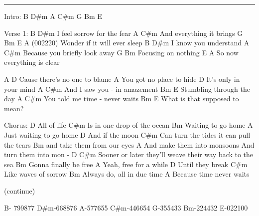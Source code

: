 \noindent\rule{\columnwidth}{1pt}

\begin{multicols}{2}
\begin{lstsong}
Intro:
B D#m A C#m G  Bm E

Verse 1:
        B            D#m
I feel sorrow for the fear
      A              C#m 
And everything it brings
   G         Bm          E     A (002220)
Wonder if it will ever sleep
   B           D#m
I know you understand
             A           C#m
Because you briefly look away
G            Bm
Focusing on nothing 
   E                  A
So now everything is clear


A                       D
Cause there's no one to blame
                     A                    
You got no place to hide
                   D
It's only in your mind
           A       C#m
And I saw you - in amazement
Bm                     E
Stumbling through the day
             A            C#m
You told me time - never waits
          Bm              E
What is that supposed to mean?








Chorus:
        D
All of life
           C#m
Is in one drop of the ocean
              Bm
Waiting to go home
                    A
Just waiting to go home
           D
And if the moon
              C#m
Can turn the tides it can pull the tears
                        Bm
and take them from our eyes
                     A
And make them into monsoons                
And turn them into mon -
D                                    C#m
Sooner or later they'll weave their way back to the sea
                   Bm
Gonna finally be free
                   A
Yeah, free for a while
            D
Until they break
               C#m
Like waves of sorrow
                    Bm
Always do, all in due time
                     A
Because time never waits

(continue)

B- 799877
D#m-668876
A-577655
C#m-446654
G-355433
Bm-224432
E-022100
\end{lstsong}
\end{multicols}
\newpage

